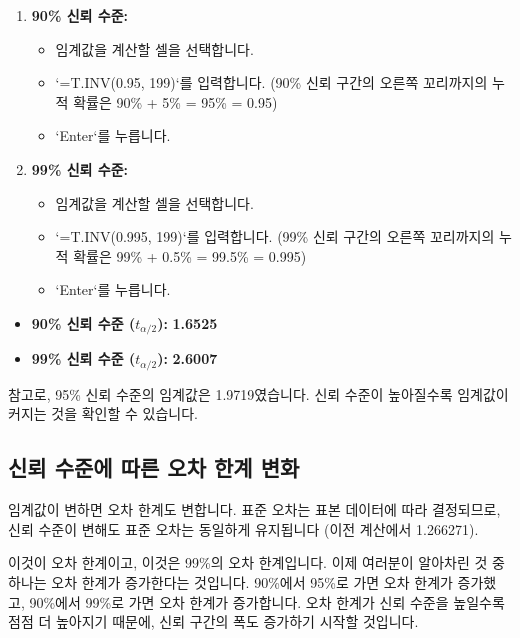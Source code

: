 \documentclass[11pt,a4paper]{article}
\begin{document}
\begin{enumerate}
    \item \textbf{90\% 신뢰 수준:}
        \begin{itemize}
            \item 임계값을 계산할 셀을 선택합니다.
            \item `=T.INV(0.95, 199)`를 입력합니다. (90\% 신뢰 구간의 오른쪽 꼬리까지의 누적 확률은 90\% + 5\% = 95\% = 0.95)
            \item `Enter`를 누릅니다.
        \end{itemize}
    \item \textbf{99\% 신뢰 수준:}
        \begin{itemize}
            \item 임계값을 계산할 셀을 선택합니다.
            \item `=T.INV(0.995, 199)`를 입력합니다. (99\% 신뢰 구간의 오른쪽 꼬리까지의 누적 확률은 99\% + 0.5\% = 99.5\% = 0.995)
            \item `Enter`를 누릅니다.
        \end{itemize}
\end{enumerate}
\begin{tcolorbox}[colback=mygreen!10!white, colframe=mygreen!75!black, title=계산 결과: 신뢰 수준별 t-분포 임계값]
\begin{itemize}
    \item \textbf{90\% 신뢰 수준 ($t_{\alpha/2}$):} \textbf{1.6525}
    \item \textbf{99\% 신뢰 수준 ($t_{\alpha/2}$):} \textbf{2.6007}
\end{itemize}
참고로, 95\% 신뢰 수준의 임계값은 1.9719였습니다. 신뢰 수준이 높아질수록 임계값이 커지는 것을 확인할 수 있습니다.
\end{tcolorbox}

\subsection{신뢰 수준에 따른 오차 한계 변화}

임계값이 변하면 오차 한계도 변합니다. 표준 오차는 표본 데이터에 따라 결정되므로, 신뢰 수준이 변해도 표준 오차는 동일하게 유지됩니다 (이전 계산에서 1.266271).

\begin{tcolorbox}[title=슬라이드 61: 뉴욕 일일 기온 샘플 Excel 시트 (8/13)]
이것이 오차 한계이고, 이것은 99\%의 오차 한계입니다. 이제 여러분이 알아차린 것 중 하나는 오차 한계가 증가한다는 것입니다. 90\%에서 95\%로 가면 오차 한계가 증가했고, 90\%에서 99\%로 가면 오차 한계가 증가합니다. 오차 한계가 신뢰 수준을 높일수록 점점 더 높아지기 때문에, 신뢰 구간의 폭도 증가하기 시작할 것입니다.
\end{tcolorbox}
\end{document}
